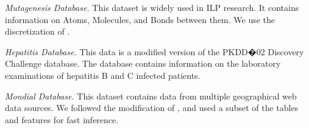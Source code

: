 \documentclass[twoside,leqno,twocolumn]{article}
\begin{document}
{\em Mutagenesis Database.} This dataset is widely used in ILP research.
It contains information on Atoms, Molecules, and Bonds between them. We use the discretization of \cite{Schulte2012}.
%

{\em Hepatitis Database.} This data is a modified version of the PKDD�02 Discovery Challenge database.
The database contains information on the laboratory examinations of hepatitis B and C infected patients. 


{\em Mondial Database.} 
%
%
This dataset contains data from multiple geographical web data sources. We followed the modification of \cite{wangMondial}, and used a subset of the tables and features for fast inference. 
\end{document}
